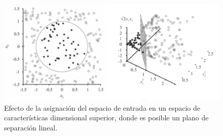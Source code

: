 \begin{figure}[H]
\centering
\includegraphics[scale=0.8]{img/svm2}
\caption{Efecto de la asignación del espacio de entrada en un espacio de características dimensional superior, donde es posible un plano de separación lineal.
}
\label{fig:svm2}
\end{figure}

